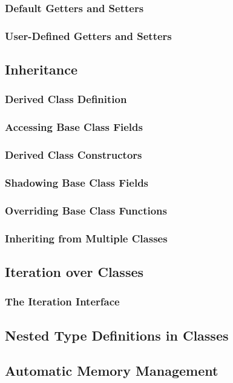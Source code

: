 \documentclass[10pt,twoside,titlepage]{article}
\begin{document}
\subsubsection{Default Getters and Setters}
\subsubsection{User-Defined Getters and Setters}
\subsection{Inheritance}
\subsubsection{Derived Class Definition}
\subsubsection{Accessing Base Class Fields}
\subsubsection{Derived Class Constructors}
\subsubsection{Shadowing Base Class Fields}
\subsubsection{Overriding Base Class Functions}
\subsubsection{Inheriting from Multiple Classes}
\subsection{Iteration over Classes}
\subsubsection{The Iteration Interface}
\subsection{Nested Type Definitions in Classes}
\subsection{Automatic Memory Management}
\end{document}
